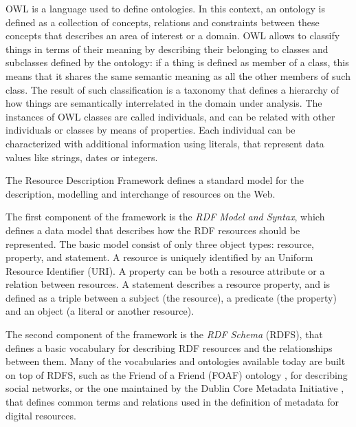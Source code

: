 \documentclass[%
    corpo=13.5pt,
    twoside,
    oldstyle,
    tipotesi=magistrale,
    greek,
    evenboxes
]{toptesi}
\begin{document}
OWL is a language used to define ontologies. In this context, an ontology
is defined as a collection of concepts, relations and constraints between
these concepts that describes an area of interest or a domain.
OWL allows to classify things in terms of their meaning by describing
their belonging to classes and subclasses defined by the ontology: if
a thing is defined as member of a class, this means that it shares the
same semantic meaning as all the other members of such class. The result of
such classification is a taxonomy that defines a hierarchy of how things
are semantically interrelated in the domain under analysis.
The instances of OWL classes are called individuals, and can be related
with other individuals or classes by means of properties. Each individual
can be characterized with additional information using literals, that
represent data values like strings, dates or integers.
\newline

The Resource Description Framework defines a standard model for the
description, modelling and interchange of resources on the Web.

The first component of the framework is the \emph{RDF Model and Syntax},
which defines a data model that describes how the RDF resources should be
represented. The basic model consist of only three object types: resource,
property, and statement.
A resource is uniquely identified by an Uniform Resource Identifier (URI).
A property can be both a resource attribute or a relation between resources.
A statement describes a resource property, and is defined as a triple
between a subject (the resource), a predicate (the property) and an
object (a literal or another resource).

The second component of the framework is the \emph{RDF Schema} (RDFS),
that defines a basic vocabulary for describing RDF resources and the
relationships between them. Many of the vocabularies and ontologies available
today are built on top of RDFS, such as the Friend of a Friend (FOAF)
ontology \cite{brickley2007}, for describing social networks, or the one
maintained by the Dublin Core Metadata Initiative \cite{weibel1998}, that
defines common terms and relations used in the definition of metadata for
digital resources.
\end{document}
